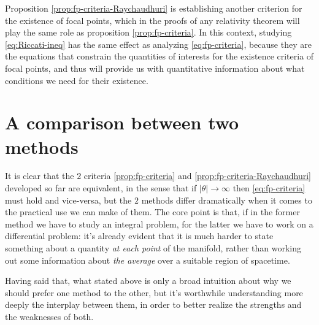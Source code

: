 	Proposition \ref{prop:fp-criteria-Raychaudhuri} is establishing another criterion for the existence of focal points, which in the proofs of any relativity theorem will play the same role as proposition \ref{prop:fp-criteria}. In this context, studying \ref{eq:Riccati-ineq} has the same effect as analyzing \ref{eq:fp-criteria}, because they are the equations that constrain the quantities of interests for the existence criteria of focal points, and thus will provide us with quantitative information about what conditions we need for their existence.
	
	\section{A comparison between two methods}
	It is clear that the \(2\) criteria \ref{prop:fp-criteria} and \ref{prop:fp-criteria-Raychaudhuri} developed so far are equivalent, in the sense that if \(\vert\theta\vert \rightarrow \infty\) then \eqref{eq:fp-criteria} must hold and vice-versa, but the \(2\) methods differ dramatically when it comes to the practical use we can make of them. The core point is that, if in the former method we have to study an integral problem, for the latter we have to work on a differential problem: it's already evident that it is much harder to state something about a quantity \emph{at each point} of the manifold, rather than working out some information about \emph{the average} over a suitable region of spacetime.
	
	Having said that, what stated above is only a broad intuition about why we should prefer one method to the other, but it's worthwhile understanding more deeply the interplay between them, in order to better realize the strengths and the weaknesses of both.
	
